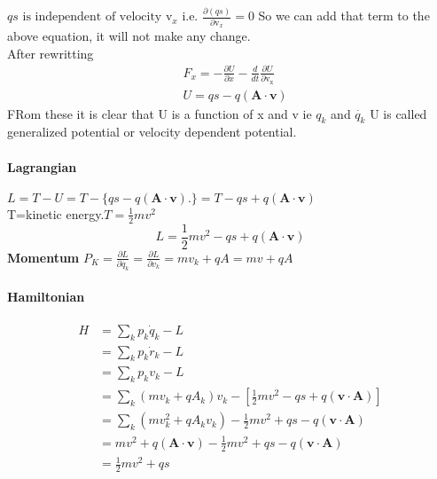 $q s \text { is independent of velocity } \mathrm{v}_{x} \text { i.e. } \frac{\partial(q s)}{\partial \mathrm{v}_{x}}=0$
So we can add that term to the above equation, it will not make any change.\\
After rewritting\\
$$\begin{aligned}
	&F_{x}=-\frac{\partial U}{\partial x}-\frac{d}{d t} \frac{\partial U}{\partial \mathrm{v}_{\mathrm{x}}} \\
	&U=q s-q(\mathbf{A} \cdot \mathbf{v})
\end{aligned}$$
FRom these it is clear that  U is a function of x and v ie $q_k$ and $\dot{q_k}$
U is called generalized potential or velocity dependent potential.\\
\paragraph{Lagrangian }
$L=T-U=T-\{q s-q(\mathbf{A} \cdot \mathbf{v}) .\}=T-q s+q(\mathbf{A} \cdot \mathbf{v})$\\
T=kinetic energy.$T=\frac{1}{2}mv^2$
$$L=\frac{1}{2}mv^2-q s+q(\mathbf{A} \cdot \mathbf{v})$$
\textbf{Momentum} $P_K=\frac{\partial L}{\partial \dot{q_k}}=\frac{\partial L}{\partial v_k}=mv_k+qA=mv+qA$\\
\paragraph{Hamiltonian}
$$\begin{aligned}
	H &=\sum_{k} p_{k} \dot{q}_{k}-L \\
	&=\sum_{k} p_{k} \dot{r}_{k}-L \\
	&=\sum_{k} p_{k} v_{k}-L \\
	&=\sum_{k}\left(m v_{k}+q A_{k}\right) v_{k}-\left[\frac{1}{2} m v^{2}-q s+q(\mathbf{v} \cdot \mathbf{A})\right] \\
	&=\sum_{k}\left(m v_{k}^{2}+q A_{k} v_{k}\right)-\frac{1}{2} m v^{2}+q s-q(\mathbf{v} \cdot \mathbf{A}) \\
	&=m v^{2}+q(\mathbf{A} \cdot \mathbf{v})-\frac{1}{2} m v^{2}+q s-q(\mathbf{v} \cdot \mathbf{A}) \\
	&=\frac{1}{2} m v^{2}+q s
\end{aligned}$$

